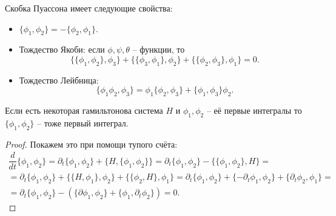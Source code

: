 \begin{corollary}
    Скобка Пуассона имеет следующие свойства:
    \begin{itemize}
        \item $\{\phi_1, \phi_2\} = -\{\phi_2, \phi_1\}$.
        \item Тождество Якоби: если $\phi, \psi, \theta$ -- функции, то
        \[
            \{\{\phi_1, \phi_2\}, \phi_3\} + \{\{\phi_3, \phi_1\}, \phi_2\} + \{\{\phi_2, \phi_3\}, \phi_1\} = 0.
        \]
        \item Тождество Лейбница:
        \[
            \{\phi_1 \phi_2, \phi_3\} = \phi_1 \{\phi_2, \phi_3\} + \{\phi_1, \phi_3\}\phi_2.
        \]
    \end{itemize}
\end{corollary}
\begin{theorem}
    Если есть некоторая гамильтонова система $H$ и $\phi_1, \phi_2$ -- её первые интегралы то $\{\phi_1, \phi_2\}$ -- тоже первый интеграл.
\end{theorem}
\begin{proof}
    Покажем это при помощи тупого счёта:
    \begin{multline*}
        \dfrac{d}{dt}\{\phi_1, \phi_2\} = \partial_t\{\phi_1, \phi_2\} + \{H, \{\phi_1, \phi_2\}\} = \partial_t \{\phi_1, \phi_2\} - \{\{\phi_1, \phi_2\}, H\} = \\ = \partial_t \{\phi_1, \phi_2\} + \{\{H, \phi_1\}, \phi_2\} + \{\{\phi_2, H\}, \phi_1\} = \partial_t \{\phi_1, \phi_2\} + \{ -\partial_t \phi_1, \phi_2\} + \{\partial_t \phi_2, \phi_1\} = \\ = \partial_t \{\phi_1, \phi_2\} - (\{\partial \phi_1, \phi_2\} + \{\phi_1, \partial_t\phi_2\}) = 0.
    \end{multline*}
\end{proof}
